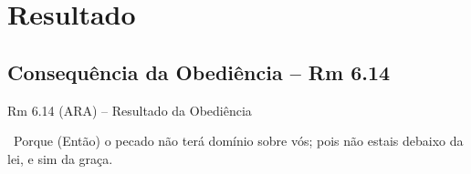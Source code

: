 \documentclass[12pt,aspectratio=169]{beamer}
\newcommand{\ver}[1]{%
    \raisebox{0.50ex}{%
        \scalebox{1.1}{%
            \pmb{\textbf{\textcolor{BSpbg}{#1}}}%
        }%
    }%
}
\newcommand{\QUOTE}[1]{%
    \par\noindent\hspace*{0.05\linewidth}%
    \begin{minipage}{0.9\linewidth}%
        \linespread{1.35}\large{#1}%
    \end{minipage}%
}
\newcommand{\RED}[1]{{\textcolor{TXred}{#1}}}
\newcommand{\ORA}[1]{{\textcolor{TXred!50!TXyel}{#1}}}
\newcommand{\YEL}[1]{{\textcolor{TXyel}{#1}}}
\newcommand{\GRE}[1]{{\textcolor{TXgre}{#1}}}
\begin{document}
\section{Resultado}

    \subsection{Consequência da Obediência -- Rm 6.14}

    \begin{frame}{Rm 6.14 (ARA) -- Resultado da Obediência}
        \QUOTE{%
            \ver{14}~Porque (\ORA{Então}) \YEL{o pecado não terá domínio sobre vós}; pois não
            estais \RED{debaixo da lei}, \GRE{e sim da graça}.
        }
    \end{frame}

\end{document}
